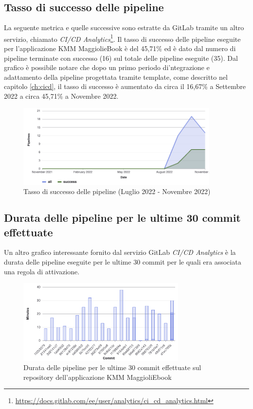 \subsection*{Tasso di successo delle pipeline}
La seguente metrica e quelle successive sono estratte da GitLab tramite un altro servizio, 
chiamato \textit{CI/CD Analytics}\footnote{\href{https://docs.gitlab.com/ee/user/analytics/ci\_cd\_analytics.html}{https://docs.gitlab.com/ee/user/analytics/ci\_cd\_analytics.html}}. 
Il tasso di successo delle pipeline eseguite per l'applicazione KMM MaggiolieBook è del 45,71\% ed è dato dal numero di pipeline terminate con successo (16) sul totale delle pipeline eseguite (35). 
Dal grafico è possibile notare che dopo un primo periodo di'ntegrazione e adattamento della pipeline progettata tramite template, 
come descritto nel capitolo \ref{ch:cicd}, 
il tasso di successo è aumentato da circa il 16,67\% a Settembre 2022 a circa 45,71\% a Novembre 2022.

\begin{figure}[H]
\centering
    \includegraphics[width=0.9\textwidth]{img/gitlab-pipeline-chart.png}
    \caption{Tasso di successo delle pipeline (Luglio 2022 - Novembre 2022)}
    \label{gitlab-pipeline-chart}
\end{figure}

\subsection*{Durata delle pipeline per le ultime 30 commit effettuate}
Un altro grafico interessante fornito dal servizio GitLab \textit{CI/CD Analytics} è la durata delle pipeline eseguite per le ultime 30 commit per le quali era associata una regola di attivazione.

\begin{figure}[H]
\centering
    \includegraphics[width=0.75\textwidth]{img/gitlab-cicd-stats.png}
    \caption{Durata delle pipeline per le ultime 30 commit effettuate sul repository dell'applicazione KMM MaggioliEbook}
    \label{gitlab-cicd-stats}
\end{figure}

